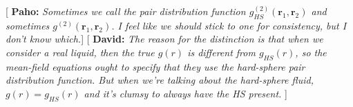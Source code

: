 \documentclass[letterpaper,twocolumn,amsmath,amssymb,pre,aps,10pt]{revtex4-1}
\newcommand{\green}[1]{{\bf \color{green} #1}}
\newcommand{\rr}{\textbf{r}}
\newcommand{\davidsays}[1]{{\color{red} [\green{David:} \emph{#1}]}}
\newcommand{\pahosays}[1]{{\color{red} [\green{Paho:} \emph{#1}]}}
\begin{document}
\pahosays{Sometimes we call the pair distribution function
  $g^{(2)}_{HS}(\rr_1,\rr_2)$ and sometimes $g^{(2)}(\rr_1,\rr_2)$. I feel
  like we should stick to one for consistency, but I don't know
  which.}
\davidsays{The reason for the distinction is that when we consider a
  real liquid, then the true $g(r)$ is different from $g_{HS}(r)$, so
  the mean-field equations ought to specify that they use the
  hard-sphere pair distribution function.  But when we're talking
  about the hard-sphere fluid, $g(r) = g_{HS}(r)$ and it's clumsy to
  always have the HS present. }

\end{document}
